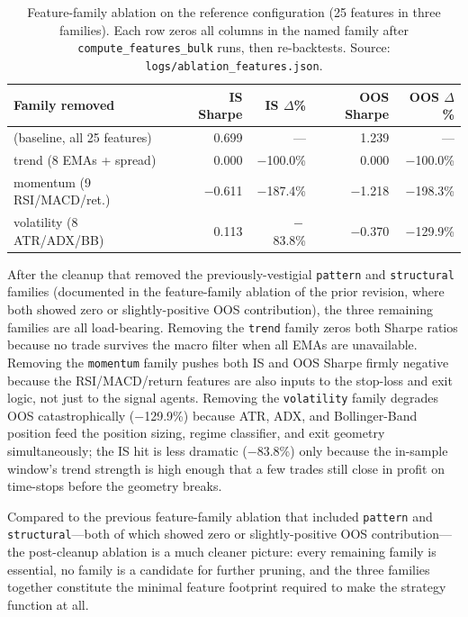 \documentclass{article}
\begin{document}
\begin{table}[h]
\centering
\caption{Feature-family ablation on the reference configuration (25 features in three families). Each row zeros all columns in the named family after \texttt{compute\_features\_bulk} runs, then re-backtests. Source: \texttt{logs/ablation\_features.json}.}
\label{tab:ablation_features}
\small
\begin{tabular}{@{}lrrrr@{}}
\toprule
\textbf{Family removed}  & \textbf{IS Sharpe} & \textbf{IS $\Delta$\%} & \textbf{OOS Sharpe} & \textbf{OOS $\Delta$\%} \\
\midrule
(baseline, all 25 features) & $\phantom{-}$0.699 & --- & $\phantom{-}$1.239 & --- \\
\midrule
trend (8 EMAs + spread)     & $\phantom{-}$0.000 & $-$100.0\% & $\phantom{-}$0.000 & $-$100.0\% \\
momentum (9 RSI/MACD/ret.)   & $-$0.611 & $-$187.4\% & $-$1.218 & $-$198.3\% \\
volatility (8 ATR/ADX/BB)   & $\phantom{-}$0.113 & $\phantom{0}-$83.8\% & $-$0.370 & $-$129.9\% \\
\bottomrule
\end{tabular}
\end{table}

After the cleanup that removed the previously-vestigial \texttt{pattern} and \texttt{structural} families (documented in the feature-family ablation of the prior revision, where both showed zero or slightly-positive OOS contribution), the three remaining families are all load-bearing.
Removing the \texttt{trend} family zeros both Sharpe ratios because no trade survives the macro filter when all EMAs are unavailable.
Removing the \texttt{momentum} family pushes both IS and OOS Sharpe firmly negative because the RSI/MACD/return features are also inputs to the stop-loss and exit logic, not just to the signal agents.
Removing the \texttt{volatility} family degrades OOS catastrophically ($-$129.9\%) because ATR, ADX, and Bollinger-Band position feed the position sizing, regime classifier, and exit geometry simultaneously; the IS hit is less dramatic ($-$83.8\%) only because the in-sample window's trend strength is high enough that a few trades still close in profit on time-stops before the geometry breaks.

Compared to the previous feature-family ablation that included \texttt{pattern} and \texttt{structural}---both of which showed zero or slightly-positive OOS contribution---the post-cleanup ablation is a much cleaner picture: every remaining family is essential, no family is a candidate for further pruning, and the three families together constitute the minimal feature footprint required to make the strategy function at all.
\end{document}
